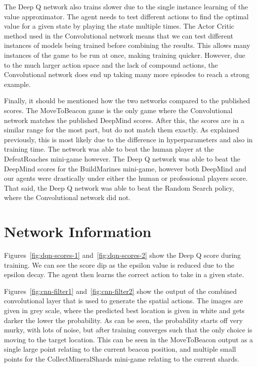 The Deep Q network also trains slower due to the single instance learning of the
value approximator. The agent needs to test different actions to find the
optimal value for a given state by playing the state multiple times. The Actor
Critic method used in the Convolutional network means that we can test different
instances of models being trained before combining the results. This allows many
instances of the game to be run at once, making training quicker. However, due
to the much larger action space and the lack of compound actions, the
Convolutional network does end up taking many more episodes to reach a strong
example.

Finally, it should be mentioned how the two networks compared to the published
scores. The MoveToBeacon game is the only game where the Convolutional network
matches the published DeepMind scores. After this, the scores are in a similar
range for the most part, but do not match them exactly. As explained previously,
this is most likely due to the difference in hyperparameters and also in
training time. The network was able to beat the human player at the
DefeatRoaches mini-game however. The Deep Q network was able to beat the
DeepMind scores for the BuildMarines mini-game, however both DeepMind and our
agents were drastically under either the human or professional players score.
That said, the Deep Q network was able to beat the Random Search policy, where
the Convolutional network did not.

\section{Network Information}

Figures~\ref{fig:dqn-scores-1} and~\ref{fig:dqn-scores-2} show the Deep Q score
during training. We can see the score dip as the epsilon value is reduced due to
the epsilon decay. The agent then learns the correct action to take in a given
state.

Figures~\ref{fig:cnn-filter1} and~\ref{fig:cnn-filter2} show the output of the
combined convolutional layer that is used to generate the spatial actions. The
images are given in grey scale, where the predicted best location is given in
white and gets darker the lower the probability. As can be seen, the
probability starts off very murky, with lots of noise, but after training
converges such that the only choice is moving to the target location. This can
be seen in the MoveToBeacon output as a single large point relating to the
current beacon position, and multiple small points for the CollectMineralShards
mini-game relating to the current shards.

